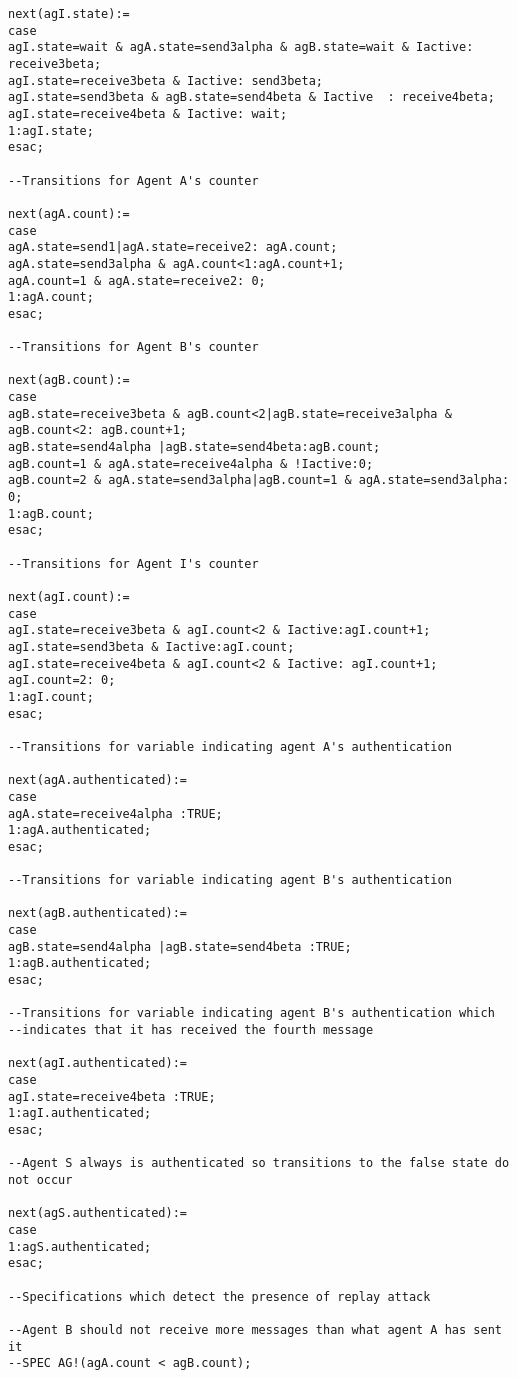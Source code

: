\begin{appendix}
{\begin{verbatim}
next(agI.state):=
case
agI.state=wait & agA.state=send3alpha & agB.state=wait & Iactive: receive3beta;
agI.state=receive3beta & Iactive: send3beta;
agI.state=send3beta & agB.state=send4beta & Iactive  : receive4beta;
agI.state=receive4beta & Iactive: wait;
1:agI.state;
esac;

--Transitions for Agent A's counter

next(agA.count):=
case
agA.state=send1|agA.state=receive2: agA.count;
agA.state=send3alpha & agA.count<1:agA.count+1;
agA.count=1 & agA.state=receive2: 0;
1:agA.count;
esac;

--Transitions for Agent B's counter

next(agB.count):=
case
agB.state=receive3beta & agB.count<2|agB.state=receive3alpha & agB.count<2: agB.count+1;
agB.state=send4alpha |agB.state=send4beta:agB.count;
agB.count=1 & agA.state=receive4alpha & !Iactive:0;
agB.count=2 & agA.state=send3alpha|agB.count=1 & agA.state=send3alpha: 0;
1:agB.count;
esac;

--Transitions for Agent I's counter

next(agI.count):=
case
agI.state=receive3beta & agI.count<2 & Iactive:agI.count+1;
agI.state=send3beta & Iactive:agI.count;
agI.state=receive4beta & agI.count<2 & Iactive: agI.count+1;
agI.count=2: 0;
1:agI.count;
esac;

--Transitions for variable indicating agent A's authentication

next(agA.authenticated):=
case
agA.state=receive4alpha :TRUE;
1:agA.authenticated;
esac;

--Transitions for variable indicating agent B's authentication

next(agB.authenticated):=
case
agB.state=send4alpha |agB.state=send4beta :TRUE;
1:agB.authenticated;
esac;

--Transitions for variable indicating agent B's authentication which 
--indicates that it has received the fourth message

next(agI.authenticated):=
case
agI.state=receive4beta :TRUE;
1:agI.authenticated;
esac;

--Agent S always is authenticated so transitions to the false state do not occur

next(agS.authenticated):=
case
1:agS.authenticated;
esac;

--Specifications which detect the presence of replay attack

--Agent B should not receive more messages than what agent A has sent it
--SPEC AG!(agA.count < agB.count);


\end{verbatim}}
\end{appendix}

